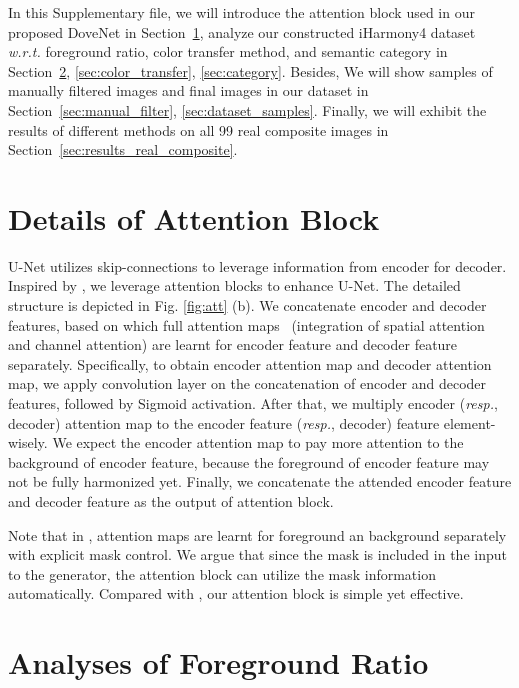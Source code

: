 \documentclass[10pt,twocolumn,letterpaper]{article}
\begin{document}
In this Supplementary file, we will introduce the attention block used in our proposed DoveNet in Section~\ref{sec:attention}, analyze our constructed iHarmony4 dataset \emph{w.r.t.} foreground ratio, color transfer method, and semantic category in Section~\ref{sec:foreground_ratio}, \ref{sec:color_transfer}, \ref{sec:category}. Besides, We will show samples of manually filtered images and final images in our dataset in Section~\ref{sec:manual_filter}, \ref{sec:dataset_samples}. Finally, we will exhibit the results of different methods on all 99 real composite images in Section~\ref{sec:results_real_composite}.



\section{Details of Attention Block}\label{sec:attention}
U-Net utilizes skip-connections to leverage information from encoder for decoder. Inspired by \cite{xiaodong2019improvingsupp}, we leverage attention blocks to enhance U-Net.
 The detailed structure is depicted in Fig. \ref{fig:att} (b). We concatenate encoder and decoder features, based on which full attention maps~\cite{yu2019freesupp} (integration of spatial attention and channel attention) are learnt for encoder feature and decoder feature separately. Specifically, to obtain encoder attention map and decoder attention map, we apply  convolution layer on the concatenation of encoder and decoder features, followed by Sigmoid activation. After that, we multiply encoder (\emph{resp.}, decoder) attention map to the encoder feature (\emph{resp.}, decoder) feature element-wisely. We expect the encoder attention map to pay more attention to the background of encoder feature, because the foreground of encoder feature may not be fully harmonized yet.
 Finally, we concatenate the attended encoder feature and decoder feature as the output of attention block.
 
Note that in \cite{xiaodong2019improvingsupp}, attention maps are learnt for foreground an background separately with explicit mask control. We argue that since the mask is included in the input to the generator, the attention block can utilize the mask information automatically. Compared with \cite{xiaodong2019improvingsupp}, our attention block is simple yet effective.


\section{Analyses of Foreground Ratio}\label{sec:foreground_ratio}
\end{document}
